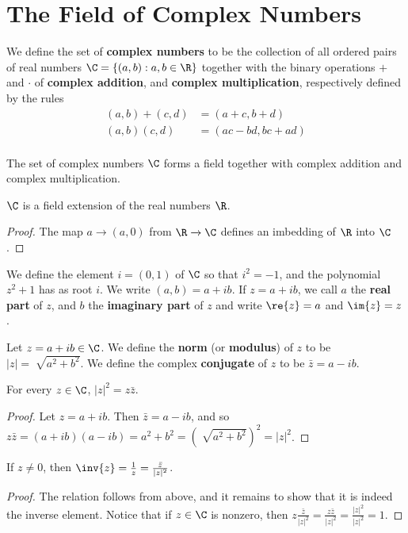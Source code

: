\section{The Field of Complex Numbers}

\begin{definition}
    We define the set of \textbf{complex numbers} to be the collection of all
    ordered pairs of real numbers $\C=\{(a,b) : a,b \in \R\}$ together with the
    binary operations $+$ and  $\cdot$ of  \textbf{complex addition}, and
    \textbf{complex multiplication}, respectively defined by the rules
    \begin{align*}
        (a,b)+(c,d) &=  (a+c,b+d)   \\
        (a,b)(c,d)  &=  (ac-bd,bc+ad)   \\
    \end{align*}
\end{definition}

\begin{theorem}\label{1.1.1}
    The set of complex numbers $\C$ forms a field together with complex addition
    and complex multiplication.
\end{theorem}
\begin{corollary}
    $\C$ is a field extension of the real numbers $\R$.
\end{corollary}
\begin{proof}
    The map $a \xrightarrow{} (a,0)$ from $\R \xrightarrow{} \C$ defines an
    imbedding of $\R$ into  $\C$.
\end{proof}

\begin{definition}
    We define the element $i=(0,1)$ of $\C$ so that  $i^2=-1$, and the
    polynomial $z^2+1$ has as root $i$. We write $(a,b)=a+ib$. If $z=a+ib$, we
    call  $a$ the  \textbf{real part} of $z$, and  $b$ the  \textbf{imaginary
    part} of $z$ and write  $\re{z}=a$ and $\im{z}=z$.
\end{definition}

\begin{definition}
    Let $z=a+ib \in \C$. We define the \textbf{norm} (or \textbf{modulus}) of
    $z$ to be  $|z|=\sqrt[]{a^2+b^2}$. We define the complex
    \textbf{conjugate} of $z$ to be  $\bar{z}=a-ib$.
\end{definition}

\begin{lemma}\label{1.1.2}
    For every $z \in \C$,  $|z|^2=z\bar{z}$.
\end{lemma}
\begin{proof}
    Let $z=a+ib$. Then $\bar{z}=a-ib$, and so
    $z\bar{z}=(a+ib)(a-ib)=a^2+b^2=(\sqrt[]{a^2+b^2})^2=|z|^2$.
\end{proof}
\begin{corollary}
    If $z \neq 0$, then $\inv{z}=\frac{1}{z}=\frac{\bar{z}}{|z|^2}$.
\end{corollary}
\begin{proof}
    The relation follows from above, and it remains to show that it is indeed
    the inverse element. Notice that if $z \in \C$ is nonzero, then
    $z\frac{\bar{z}}{|z|^2}=\frac{z\bar{z}}{|z|^2}=\frac{|z|^2}{|z|^2}=1$.
\end{proof}

